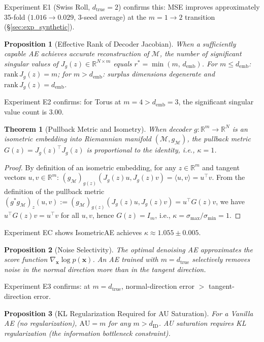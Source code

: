 \documentclass[12pt,a4paper]{article}
\newtheorem{theorem}{Theorem}
\newtheorem{proposition}{Proposition}
\newcommand{\dID}{d_{\mathrm{ID}}}
\newcommand{\dtrue}{d_{\mathrm{true}}}
\newcommand{\Jg}{J_g}
\newcommand{\R}{\mathbb{R}}
\newcommand{\kap}{\kappa}
\newcommand{\demb}{d_{\mathrm{emb}}}
\begin{document}
Experiment E1 (Swiss Roll, $\dtrue = 2$) confirms this: MSE improves approximately 35-fold ($1.016 \to 0.029$, 3-seed average) at the $m=1 \to 2$ transition (\S\ref{sec:exp_synthetic}).

\begin{proposition}[Effective Rank of Decoder Jacobian]\label{thm:rank}
When a sufficiently capable AE achieves accurate reconstruction of $\mathcal{M}$,
the number of significant singular values of $\Jg(z) \in \R^{N\times m}$
equals $r^* = \min(m,\, \demb)$.
For $m \leq \demb$: $\mathrm{rank}\,\Jg(z) = m$;
for $m > \demb$: surplus dimensions degenerate and $\mathrm{rank}\,\Jg(z) = \demb$.
\end{proposition}

Experiment E2 confirms: for Torus at $m=4 > \demb=3$, the significant singular value count is 3.00.

\begin{theorem}[Pullback Metric and Isometry]\label{thm:pullback}
When decoder $g:\R^m\to\R^N$ is an isometric embedding into Riemannian manifold $(\mathcal{M},g_\mathcal{M})$,
the pullback metric $G(z) = \Jg(z)^\top \Jg(z)$ is proportional to the identity, i.e., $\kap = 1$.
\end{theorem}
\begin{proof}
By definition of an isometric embedding, for any $z \in \R^m$ and tangent vectors $u, v \in \R^m$:
$(g_\mathcal{M})_{g(z)}(\Jg(z)u, \Jg(z)v) = \langle u, v \rangle = u^\top v$.
From the definition of the pullback metric $(g^*g_\mathcal{M})_z(u,v) := (g_\mathcal{M})_{g(z)}(\Jg(z)u, \Jg(z)v) = u^\top G(z) v$,
we have $u^\top G(z)v = u^\top v$ for all $u,v$, hence $G(z) = I_m$, i.e., $\kap = \sigma_{\max}/\sigma_{\min} = 1$.
\end{proof}

Experiment EC shows IsometricAE achieves $\kap \approx 1.055\pm0.005$.

\begin{proposition}[Noise Selectivity]\label{thm:nsr}
The optimal denoising AE approximates the score function $\nabla_{\boldsymbol{x}}\log p(\boldsymbol{x})$.
An AE trained with $m = \dtrue$ selectively removes noise in the normal direction more than in the tangent direction.
\end{proposition}

Experiment E3 confirms: at $m = \dtrue$, normal-direction error $>$ tangent-direction error.

\begin{proposition}[KL Regularization Required for AU Saturation]\label{thm:au}
For a Vanilla AE (no regularization), $\mathrm{AU} = m$ for any $m > \dID$.
AU saturation requires KL regularization (the information bottleneck constraint).
\end{proposition}
\end{document}
